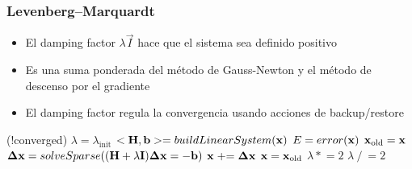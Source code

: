 \begin{frame}
    \frametitle{Levenberg–Marquardt}
    
    \footnotesize
    
    \begin{itemize}
        \item El damping factor $\lambda \vec{I}$ hace que el sistema sea definido positivo
        \item Es una suma ponderada del método de Gauss-Newton y el método de descenso por el gradiente 
        \item El damping factor regula la convergencia usando acciones de backup/restore
    \end{itemize}

    \begin{algorithmic}[1]
         
        \While (!converged)
        \State $\lambda =  \lambda_{\textrm{init}}$
        \State $<\boldsymbol{\mathbf{H}}, \boldsymbol{\mathbf{b}}> = buildLinearSystem(\boldsymbol{\mathbf{x}})$
        \State $E = error(\boldsymbol{\mathbf{x}})$
        \State $\boldsymbol{\mathbf{x}}_{\textrm{old}} = \boldsymbol{\mathbf{x}}$
        \State $\boldsymbol{\mathbf{\Delta}}\boldsymbol{\mathbf{x}} = solveSparse((\boldsymbol{\mathbf{H}} + \lambda \boldsymbol{\mathbf{I}}) \boldsymbol{\mathbf{\Delta}} \boldsymbol{\mathbf{x}} = - \boldsymbol{\mathbf{b}})$
        \State $\boldsymbol{\mathbf{x}} \mathrel{+}= \boldsymbol{\mathbf{\Delta}}\boldsymbol{\mathbf{x}}$
        \State $\boldsymbol{\mathbf{x}} = \boldsymbol{\mathbf{x}}_{\textrm{old}}$
        \State $\lambda \mathrel{*}= 2$
        \Else
        \State $\lambda \mathrel{/}= 2$
        \EndIf
        \EndWhile
        \EndProcedure
    \end{algorithmic}

\end{frame}
